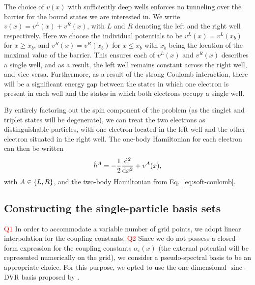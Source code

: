 \documentclass[twocolumn,superscriptaddress,unsortedaddress,
 amsmath,amssymb,
 aps,
]{revtex4-2}
\DeclareMathOperator{\sinc}{sinc}
\begin{document}
        The choice of $v(x)$ with sufficiently deep wells enforces no
        tunneling over the barrier for the bound states we are interested in. We write $v(x) = v^L(x) + v^R(x)$, with $L$ and $R$ denoting the left and the right well respectively.
        Here we choose the individual potentials to be $v^L(x) = v^L(x_b)$
        for $x \geq x_b$, and $v^R(x) = v^R(x_b)$ for $x \leq x_b$ with $x_b$ being the location of the maximal value of the barrier.
        This ensures each of $v^L(x)$ and $v^R(x)$ describes a single well, and as a result, the left well remains constant across the right well, and vice versa.
        Furthermore, as a result of the strong Coulomb interaction, there will be a significant energy gap between the states in which one electron is present in each well and the states in which both electrons occupy a single well.
        
        By entirely factoring out the spin component of the problem (as the singlet and triplet states will be degenerate), we can treat the two electrons as distinguishable particles, with one electron located in the left well and the other electron situated in the right well.
        The one-body Hamiltonian for each electron can then be written
        \begin{align}
            \hat{h}^A
            = -\frac{1}{2} \dv[2]{}{x}
            + v^A(x),
            \label{eq:one-body-hamiltonian}
        \end{align}
        with $A \in \qty{L, R}$, and the two-body Hamiltonian from
        Eq.~\eqref{eq:soft-coulomb}.

    \subsection{Constructing the single-particle basis sets}
        \label{sec:basis-set}
        \textcolor{red}{Q1} In order to accommodate a variable number of grid points, we adopt linear interpolation for the coupling constants. 
        \textcolor{red}{Q2} Since we do not possess a closed-form expression for the coupling constants $\alpha_i(x)$ (the external potential will be represented numerically on the grid), we consider a pseudo-spectral basis to be an appropriate choice.
        For this purpose, we opted to use the one-dimensional $\sinc$-DVR basis proposed by \citet{colbert-sinc}.
\end{document}
